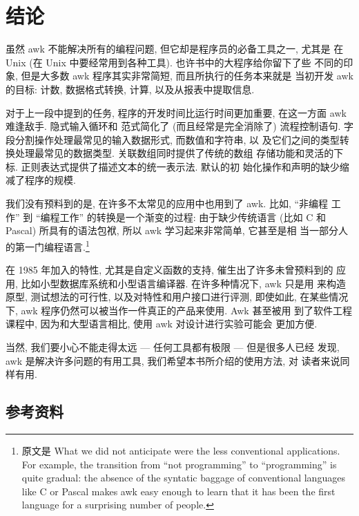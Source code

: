 \section{结论}
\label{sec:conclusion}
虽然 awk 不能解决所有的编程问题, 但它却是程序员的必备工具之一, 尤其是
在 Unix (在 Unix 中要经常用到各种工具). 也许书中的大程序给你留下了些
不同的印象, 但是大多数 awk 程序其实非常简短, 而且所执行的任务本来就是
当初开发 awk 的目标: 计数, 数据格式转换, 计算, 以及从报表中提取信息.

对于上一段中提到的任务, 程序的开发时间比运行时间更加重要, 在这一方面
awk 难逢敌手. 隐式输入循环和 \patact 范式简化了 (而且经常是完全消除了)
流程控制语句. 字段分割操作处理最常见的输入数据形式, 而数值和字符串, 以
及它们之间的类型转换处理最常见的数据类型. 关联数组同时提供了传统的数组
存储功能和灵活的下标. 正则表达式提供了描述文本的统一表示法. 默认的初
始化操作和声明的缺少缩减了程序的规模.

我们没有预料到的是,  在许多不太常见的应用中也用到了 awk. 比如, ``非编程
工作'' 到 ``编程工作'' 的转换是一个渐变的过程: 由于缺少传统语言 (比如 
C 和 Pascal) 所具有的语法包袱, 所以 awk 学习起来非常简单, 它甚至是相
当一部分人的第一门编程语言.\footnote{原文是 What we did not anticipate were
    the less conventional applications. For example, the transition from
    ``not programming'' to ``programming'' is quite gradual: the absence of
    the syntatic baggage of conventional languages like C or Pascal makes
    awk easy enough to learn that it has been the first language for a
surprising number of people.}

在 1985 年加入的特性, 尤其是自定义函数的支持, 催生出了许多未曾预料到的
应用, 比如小型数据库系统和小型语言编译器. 在许多种情况下, awk 只是用
来构造原型, 测试想法的可行性, 以及对特性和用户接口进行评测, 即使如此,
在某些情况下, awk 程序仍然可以被当作一件真正的产品来使用. Awk 甚至被用
到了软件工程课程中, 因为和大型语言相比, 使用 awk 对设计进行实验可能会
更加方便.

当然, 我们要小心不能走得太远 --- 任何工具都有极限 --- 但是很多人已经
发现, awk 是解决许多问题的有用工具, 我们希望本书所介绍的使用方法, 对
读者来说同样有用.

\subsection*{参考资料}
